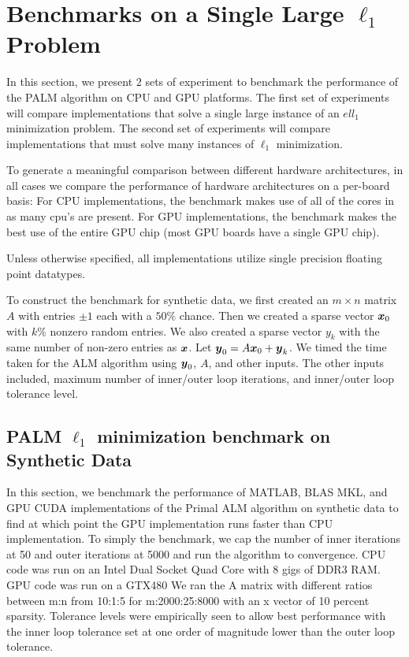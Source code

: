 \documentclass[10pt,twocolumn,letterpaper]{article}
\begin{document}
\section{Benchmarks on a Single Large $\ell_1$ Problem}

In this section, we present $2$ sets of experiment to benchmark the performance
of the PALM algorithm on CPU and GPU platforms. 
The first set of experiments will compare implementations that solve a single
large instance of an $ell_1$ minimization problem.  
The second set of experiments will compare implementations that must solve
many instances of $\ell_1$ minimization.  

To generate a meaningful comparison between different hardware architectures,
in all cases we compare the performance of hardware architectures on a
per-board basis:  For CPU implementations, the benchmark makes use of all of
the cores in as many cpu's are present.  For GPU implementations, the benchmark
makes the best use of the entire GPU chip (most GPU boards have a single GPU
chip). 

Unless otherwise specified, all implementations utilize single precision
floating point datatypes.

To construct the benchmark for synthetic data, we first created an $m \times n$
matrix $A$ with entries $\pm 1$ each with a $50\%$ chance.  Then we created a
sparse vector ${\boldsymbol{x}}_0$ with $k\%$ nonzero random entries.  We also created a
sparse vector $y_k$ with the same number of non-zero entries as ${\boldsymbol{x}}$.  Let
$\boldsymbol{y}_0 = A {\boldsymbol{x}}_0 + \boldsymbol{y}_k$.  We timed the time taken for the ALM algorithm using
$\boldsymbol{y}_0$, $A$, and other inputs.  The other inputs included, maximum number of
inner/outer loop iterations, and inner/outer loop tolerance level.


\subsection{PALM $\ell_1$ minimization benchmark on Synthetic Data}

In this section, we benchmark the performance of MATLAB, BLAS MKL, and GPU CUDA
implementations of the Primal ALM algorithm on synthetic data to find at which
point the GPU implementation runs faster than CPU implementation.  To simply
the benchmark, we cap the number of inner iterations at 50 and outer iterations
at 5000 and run the algorithm to convergence.  CPU code was run on an Intel
Dual Socket Quad Core with 8 gigs of DDR3 RAM.  GPU code was run on a GTX480 We
ran the A matrix with different ratios between m:n from 10:1:5 for
m:2000:25:8000 with an x vector of 10 percent sparsity.  Tolerance levels were
empirically seen to allow best performance with the inner loop tolerance set at
one order of magnitude lower than the outer loop tolerance.
\end{document}
